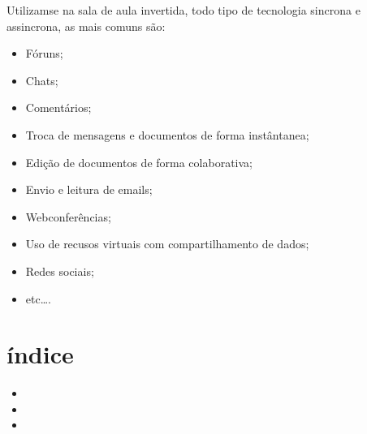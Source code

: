 \documentclass[letterpaper,10pt,brazil]{sphinxmanual}
\begin{document}
Utilizam\sphinxhyphen{}se na sala de aula invertida, todo tipo de tecnologia sincrona e assincrona, as mais comuns são:
\begin{itemize}
\item {} 
Fóruns;

\item {} 
Chats;

\item {} 
Comentários;

\item {} 
Troca de mensagens e documentos de forma instântanea;

\item {} 
Edição de documentos de forma colaborativa;

\item {} 
Envio e leitura de emails;

\item {} 
Webconferências;

\item {} 
Uso de recusos virtuais com compartilhamento de dados;

\item {} 
Redes sociais;

\item {} 
etc….

\end{itemize}


\chapter{índice}
\label{\detokenize{index:indice}}\begin{itemize}
\item {} 

\item {} 

\item {} 

\end{itemize}



\renewcommand{\indexname}{Índice}
\printindex
\end{document}
